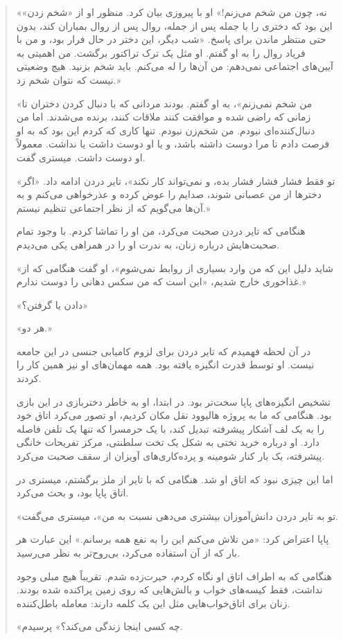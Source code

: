 \begin{quote}
«نه، چون من شخم می‌زنم!» او با پیروزی بیان کرد. منظور او از «شخم زدن» این بود که دختری را با جمله پس از جمله، روال پس از روال بمباران کند، بدون حتی منتظر ماندن برای پاسخ. «شب دیگر، این دختر در حال فرار بود، و من با فریاد روال را به او گفتم. او مثل یک ترک تراکتور برگشت. من اهمیتی به آیین‌های اجتماعی نمی‌دهم: من آن‌ها را له می‌کنم. باید شخم بزنید. هیچ وضعیتی نیست که نتوان شخم زد.»

«من شخم نمی‌زنم»، به او گفتم. بودند مردانی که با دنبال کردن دختران تا زمانی که راضی شده و موافقت کنند ملاقات کنند، برنده می‌شدند. اما من دنبال‌کننده‌ای نبودم. من شخم‌زن نبودم. تنها کاری که کردم این بود که به او فرصت دادم تا مرا دوست داشته باشد، و یا او دوست داشت یا نداشت. معمولاً او دوست داشت. میستری گفت.

«تو فقط فشار فشار فشار بده، و نمی‌تواند کار نکند»، تایر دردن ادامه داد. «اگر دخترها از من عصبانی شوند، صدایم را عوض کرده و عذرخواهی می‌کنم و به آن‌ها می‌گویم که از نظر اجتماعی تنظیم نیستم.»

هنگامی که تایر دردن صحبت می‌کرد، من او را تماشا کردم. با وجود تمام صحبت‌هایش درباره زنان، به ندرت او را در همراهی یکی می‌دیدم. 

«شاید دلیل این که من وارد بسیاری از روابط نمی‌شوم»، او گفت هنگامی که از غذاخوری خارج شدیم، «این است که من سکس دهانی را دوست ندارم.»

«دادن یا گرفتن؟»

«هر دو.»

در آن لحظه فهمیدم که تایر دردن برای لزوم کامیابی جنسی در این جامعه نیست. او توسط قدرت انگیزه یافته بود. همه مهمان‌های او نیز همین کار را کردند.

تشخیص انگیزه‌های پاپا سخت‌تر بود. در ابتدا، او به خاطر دختربازی در این بازی بود. هنگامی که ما به پروژه هالیوود نقل مکان کردیم، او تصور می‌کرد اتاق خود را به یک لف آشکار پیشرفته تبدیل کند، با یک حرمسرا که تنها یک تلفن فاصله دارد. او درباره خرید تختی به شکل یک تخت سلطنتی، مرکز تفریحات خانگی پیشرفته، یک بار کنار شومینه و پرده‌کاری‌های آویزان از سقف صحبت می‌کرد.

اما این چیزی نبود که اتاق او شد. هنگامی که با تایر از ملز برگشتم، میستری در اتاق پاپا بود، و بحث می‌کرد.

«تو به تایر دردن دانش‌آموزان بیشتری می‌دهی نسبت به من»، میستری می‌گفت.

پاپا اعتراض کرد: «من تلاش می‌کنم این را به نفع همه برسانم.» این عبارت هر بار که از آن استفاده می‌کرد، بی‌روح‌تر به نظر می‌رسید.

هنگامی که به اطراف اتاق او نگاه کردم، حیرت‌زده شدم. تقریباً هیچ مبلی وجود نداشت، فقط کیسه‌های خواب و بالش‌هایی که روی زمین پراکنده شده بودند. زنان برای اتاق‌خواب‌هایی مثل این یک کلمه دارند: معامله باطل‌کننده.

«چه کسی اینجا زندگی می‌کند؟» پرسیدم.
\end{quote}